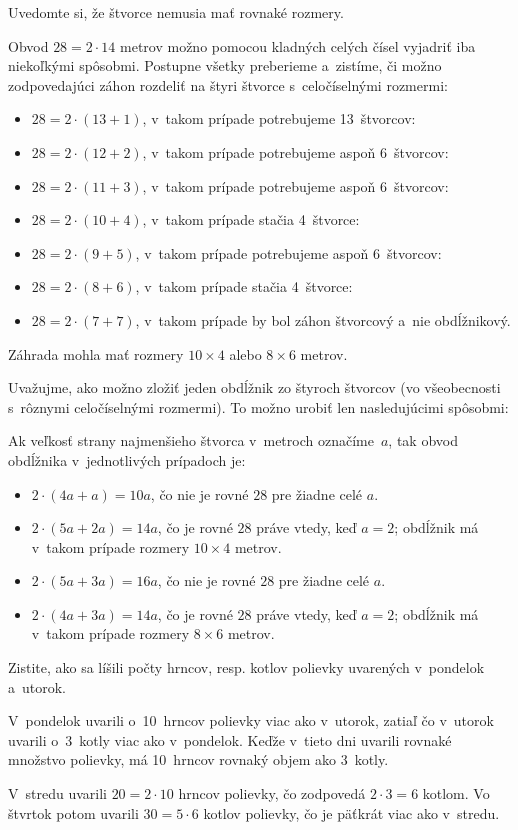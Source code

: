 {%
\napad
Uvedomte si, že štvorce nemusia mať rovnaké rozmery.


\riesenie
Obvod $28=2\cdot 14$ metrov možno pomocou kladných celých čísel vyjadriť iba
niekoľkými spôsobmi.
Postupne všetky preberieme a~zistíme, či možno zodpovedajúci záhon rozdeliť
na štyri štvorce s~celočíselnými rozmermi:
\begin{itemize}
  \item $28=2\cdot(13+1)$, v~takom prípade potrebujeme 13~štvorcov:
  \item $28=2\cdot(12+2)$, v~takom prípade potrebujeme aspoň 6~štvorcov:
  \item $28=2\cdot(11+3)$, v~takom prípade potrebujeme aspoň 6~štvorcov:
  \item $28=2\cdot(10+4)$, v~takom prípade stačia 4~štvorce:
  \item $28=2\cdot(9+5)$, v~takom prípade potrebujeme aspoň 6~štvorcov:
  \item $28=2\cdot(8+6)$, v~takom prípade stačia 4~štvorce:
  \item $28=2\cdot(7+7)$, v~takom prípade by bol záhon štvorcový a~nie obdĺžnikový.
\end{itemize}

Záhrada mohla mať rozmery $10\times 4$ alebo $8\times 6$ metrov.

\ineriesenie
Uvažujme, ako možno zložiť jeden obdĺžnik zo štyroch štvorcov (vo všeobecnosti s~rôznymi
celočíselnými rozmermi).
To možno urobiť len nasledujúcimi spôsobmi:
%


Ak veľkosť strany najmenšieho štvorca v~metroch označíme~$a$, tak obvod
obdĺžnika v~jednotlivých prípadoch je:
\begin{itemize}
  \item $2\cdot(4a+a)=10a$, čo nie je rovné $28$ pre žiadne celé $a$.
  \item $2\cdot(5a+2a)=14a$, čo je rovné $28$ práve vtedy, keď $a=2$; obdĺžnik má v~takom prípade rozmery $10\times 4$ metrov.
  \item $2\cdot(5a+3a)=16a$, čo nie je rovné $28$ pre žiadne celé $a$.
  \item $2\cdot(4a+3a)=14a$, čo je rovné $28$ práve vtedy, keď $a=2$; obdĺžnik má v~takom prípade rozmery $8\times 6$ metrov.
\end{itemize}
}

{%
\napad
Zistite, ako sa líšili počty hrncov, resp. kotlov polievky uvarených v~pondelok a~utorok.

\riesenie
V~pondelok uvarili o~10~hrncov polievky viac ako v~utorok, zatiaľ čo v~utorok uvarili
o~3~kotly viac ako v~pondelok.
Keďže v~tieto dni uvarili rovnaké množstvo polievky, má 10~hrncov rovnaký objem
ako 3~kotly.

V~stredu uvarili $20=2\cdot 10$ hrncov polievky, čo zodpovedá
$2\cdot 3=6$ kotlom.
Vo štvrtok potom uvarili $30=5\cdot 6$ kotlov polievky, čo je päťkrát viac
ako v~stredu.
}

